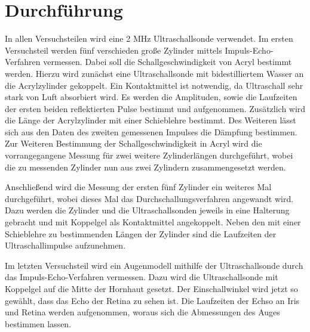 \section{Durchführung}
\label{sec:Durchführung}
In allen Versuchsteilen wird eine 2 MHz Ultraschallsonde verwendet. 
Im ersten Versuchsteil werden fünf verschieden große 
Zylinder mittels Impuls-Echo-Verfahren vermessen.
Dabei soll die Schallgeschwindigkeit von Acryl 
bestimmt werden.
Hierzu wird zunächst eine Ultraschallsonde mit bidestilliertem 
Wasser an die Acrylzylinder gekoppelt. Ein Kontaktmittel ist
notwendig, da Ultraschall sehr stark von Luft absorbiert wird.
Es werden die Amplituden, sowie die Laufzeiten der ersten
beiden reflektierten Pulse bestimmt und aufgenommen.
Zusätzlich wird die Länge der Acrylzylinder mit einer Schieblehre 
bestimmt. 
Des Weiteren lässt sich aus den Daten des zweiten gemessenen
Impulses die Dämpfung bestimmen.
Zur Weiteren Bestimmung der Schallgeschwindigkeit in Acryl
wird die vorrangegangene Messung für zwei weitere Zylinderlängen
durchgeführt, wobei die zu messenden Zylinder nun aus 
zwei Zylindern zusammengesetzt werden. 


Anschließend wird die Messung der ersten fünf Zylinder 
ein weiteres Mal durchgeführt, wobei dieses Mal das 
Durchschallungsverfahren angewandt wird. Dazu werden die 
Zylinder und die Ultraschallsonden jeweils in eine Halterung
gebracht und mit Koppelgel als Kontaktmittel angekoppelt. Neben den mit einer
Schieblehre zu bestimmenden Längen der Zylinder sind die Laufzeiten 
der Ultraschallimpulse aufzunehmen.


Im letzten Versuchsteil wird ein Augenmodell mithilfe der Ultraschallsonde
durch das Impuls-Echo-Verfahren vermessen. Dazu wird 
die Ultraschallsonde mit Koppelgel auf die Mitte der Hornhaut
gesetzt. Der Einschallwinkel wird jetzt so gewählt, dass 
das Echo der Retina zu sehen ist. Die Laufzeiten der Echso
an Iris und Retina werden aufgenommen, woraus sich die Abmessungen 
des Auges bestimmen lassen.
